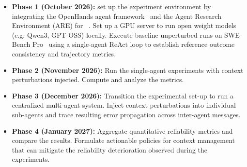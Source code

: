 \documentclass[conference]{IEEEtran}
\begin{document}
\begin{itemize}
    \item \textbf{Phase 1 (October 2026):} set up the experiment environment by integrating
		the OpenHands agent framework~\cite{openhands_2026} and the Agent Research Environment (ARE) for
		~\cite{froger_are_2025}.
		Set up a GPU server to run open weight models (e.g. Qwen3, GPT-OSS) locally.
		Execute baseline unperturbed runs on SWE-Bench Pro~\cite{swebenchpro_2025}
		using a single-agent ReAct loop to establish reference outcome consistency and trajectory metrics.

    \item \textbf{Phase 2 (November 2026):} Run the single-agent
		experiments with context perturbations injected. Compute and analyze the metrics.

    \item \textbf{Phase 3 (December 2026):} Transition the experimental
		set-up to run a centralized multi-agent system. Inject context perturbations into individual sub-agents 
		and trace resulting error propagation across inter-agent messages.

    \item \textbf{Phase 4 (January 2027):} Aggregate quantitative reliability metrics and
		compare the results. Formulate actionable policies for context management that can
		mitigate the reliability deterioration observed during the experiments.
\end{itemize}



\end{document}
